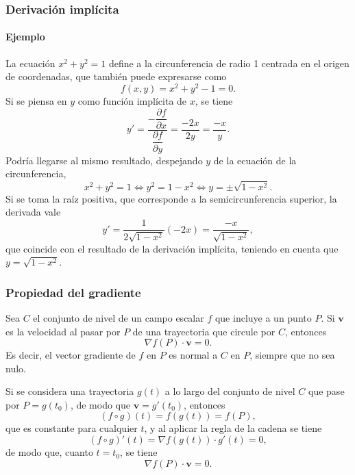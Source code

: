 \begin{frame}
	\frametitle{Derivación implícita}
	\framesubtitle{Ejemplo}
	La ecuación $x^2+y^2=1$ define a la circunferencia de radio 1 centrada en el origen de coordenadas, que también puede expresarse como
	\[
		f(x,y) = x^2+y^2-1 = 0.
	\]
	Si se piensa en $y$ como función implícita de $x$, se tiene 
	\[
		y'=\frac{-\dfrac{\partial f}{\partial x}}{\dfrac{\partial f}{\partial y}} = \frac{-2x}{2y}=\frac{-x}{y}.
	\]
	Podría llegarse al mismo resultado, despejando $y$ de la ecuación de la circunferencia, 
	\[
		x^2+y^2=1 \Leftrightarrow y^2=1-x^2 \Leftrightarrow y= \pm\sqrt{1-x^2}.
	\]
	Si se toma la raíz positiva, que corresponde a la semicircunferencia superior, la derivada vale
	\[
		y' = \frac{1}{2\sqrt{1-x^2}}(-2x) = \frac{-x}{\sqrt{1-x^2}}, 
	\]
	que coincide con el resultado de la derivación implícita, teniendo en cuenta que $y=\sqrt{1-x^2}$.
\end{frame}


\begin{frame}
	\frametitle{Propiedad del gradiente}
	\begin{teorema}
		Sea $C$ el conjunto de nivel de un campo escalar $f$ que incluye a un punto $P$. 
		Si $\mathbf{v}$ es la velocidad al pasar por $P$ de una trayectoria que circule por $C$, entonces
		\[
			\nabla f(P) \cdot \mathbf{v} = 0.
		\] 
		Es decir, el vector gradiente de $f$ en $P$ es normal a $C$ en $P$, siempre que no sea nulo.
	\end{teorema}
	Si se considera una trayectoria $g(t)$ a lo largo del conjunto de nivel $C$ que pase por $P=g(t_0)$, de modo que $\mathbf{v}=g'(t_0)$, entonces 
	\[
		(f\circ g)(t) = f(g(t)) = f(P),
	\]
	que es constante para cualquier $t$, y al aplicar la regla de la cadena se tiene
	\[
		(f\circ g)'(t) = \nabla f(g(t))\cdot  g'(t) = 0,
	\]
	de modo que, cuanto $t=t_0$, se tiene 
	\[
		\nabla f(P)\cdot \mathbf{v} = 0.
	\]
\end{frame}


